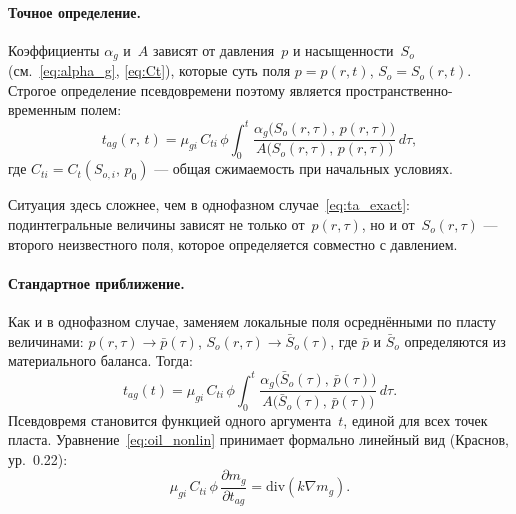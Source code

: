 ﻿\documentclass[12pt,a4paper]{article}
\begin{document}
\paragraph{Точное определение.}
Коэффициенты $\alpha_g$ и~$A$ зависят от давления~$p$ и
насыщенности~$S_o$ (см.~\eqref{eq:alpha_g}, \eqref{eq:Ct}),
которые суть поля $p = p(r,t)$, $S_o = S_o(r,t)$.
Строгое определение псевдовремени поэтому является
пространственно-временным полем:
\begin{equation}\label{eq:tao_exact}
  t_{ag}(r,\,t) = \mu_{gi}\,C_{ti}\,\phi\int_0^t
  \frac{\alpha_g\bigl(S_o(r,\tau),\,p(r,\tau)\bigr)}
       {A\bigl(S_o(r,\tau),\,p(r,\tau)\bigr)}\,d\tau,
\end{equation}
где $C_{ti} = C_t(S_{o,i},\,p_0)$ --- общая сжимаемость
при начальных условиях.

Ситуация здесь сложнее, чем в однофазном случае~\eqref{eq:ta_exact}:
подинтегральные величины зависят не только от~$p(r,\tau)$,
но и от~$S_o(r,\tau)$ --- второго неизвестного поля,
которое определяется совместно с давлением.

\paragraph{Стандартное приближение.}
Как и в однофазном случае, заменяем локальные поля
осреднёнными по пласту величинами: $p(r,\tau) \to \bar{p}(\tau)$,
$S_o(r,\tau) \to \bar{S}_o(\tau)$,
где $\bar{p}$ и $\bar{S}_o$ определяются из
материального баланса. Тогда:
\begin{equation}\label{eq:tao_def}
  \boxed{t_{ag}(t) = \mu_{gi}\,C_{ti}\,\phi\int_0^t
  \frac{\alpha_g\bigl(\bar{S}_o(\tau),\,\bar{p}(\tau)\bigr)}
       {A\bigl(\bar{S}_o(\tau),\,\bar{p}(\tau)\bigr)}\,d\tau.}
\end{equation}
Псевдовремя становится функцией одного аргумента~$t$, единой
для всех точек пласта. Уравнение~\eqref{eq:oil_nonlin}
принимает формально линейный вид
(Краснов, ур.~0.22):
\begin{equation}\label{eq:oil_linear}
  \boxed{\mu_{gi}\,C_{ti}\,\phi\,
  \frac{\partial m_g}{\partial t_{ag}}
  = \mathrm{div}(k\nabla m_g).}
\end{equation}
\end{document}
